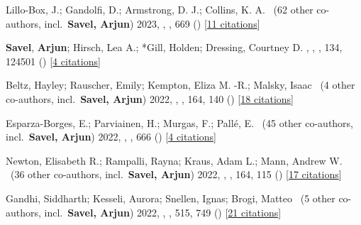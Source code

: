 \item[{\color{numcolor}\scriptsize19}] Lillo-Box, J.; Gandolfi, D.; Armstrong, D. J.; Collins, K. A. \etal\ ({62} other co-authors, incl.\ \textbf{Savel, Arjun}) 2023, , \aanda, {669} () [\href{https://ui.adsabs.harvard.edu/abs/2023A&A...669A.109L}{11 citations}]

\item[{\color{numcolor}\scriptsize18}] \textbf{Savel}, \textbf{Arjun}; Hirsch, Lea A.; *Gill, Holden; Dressing, Courtney D. , , \pasp, {134}, 124501 () [\href{https://ui.adsabs.harvard.edu/abs/2022PASP..134l4501S}{4 citations}]

\item[{\color{numcolor}\scriptsize17}] Beltz, Hayley; Rauscher, Emily; Kempton, Eliza M. -R.; Malsky, Isaac \etal\ ({4} other co-authors, incl.\ \textbf{Savel, Arjun}) 2022, , \aj, {164}, 140 () [\href{https://ui.adsabs.harvard.edu/abs/2022AJ....164..140B}{18 citations}]

\item[{\color{numcolor}\scriptsize16}] Esparza-Borges, E.; Parviainen, H.; Murgas, F.; Pall{\'e}, E. \etal\ ({45} other co-authors, incl.\ \textbf{Savel, Arjun}) 2022, , \aanda, {666} () [\href{https://ui.adsabs.harvard.edu/abs/2022A&A...666A..10E}{4 citations}]

\item[{\color{numcolor}\scriptsize15}] Newton, Elisabeth R.; Rampalli, Rayna; Kraus, Adam L.; Mann, Andrew W. \etal\ ({36} other co-authors, incl.\ \textbf{Savel, Arjun}) 2022, , \aj, {164}, 115 () [\href{https://ui.adsabs.harvard.edu/abs/2022AJ....164..115N}{17 citations}]

\item[{\color{numcolor}\scriptsize14}] Gandhi, Siddharth; Kesseli, Aurora; Snellen, Ignas; Brogi, Matteo \etal\ ({5} other co-authors, incl.\ \textbf{Savel, Arjun}) 2022, , \mnras, {515}, 749 () [\href{https://ui.adsabs.harvard.edu/abs/2022MNRAS.515..749G}{21 citations}]

